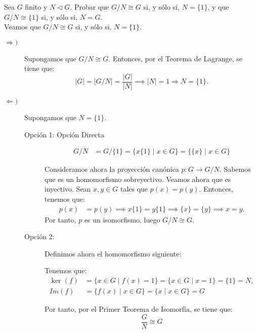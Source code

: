 \begin{ejercicio}\label{ej:9_relacion4}
    Sea $G$ finito y $N\lhd G$. Probar que $G/N\cong G$ si, y sólo si, $N=\{1\}$, y que $G/N\cong \{1\}$ si, y sólo si, $N=G$.\\

    Veamos que $G/N\cong G$ si, y sólo si, $N=\{1\}$.
    \begin{description}
        \item[$\Longrightarrow)$] Supongamos que $G/N\cong G$. Entonces, por el Teorema de Lagrange, se tiene que:
        \begin{equation*}
            |G| = |G/N| = \dfrac{|G|}{|N|} \implies |N|=1\Longrightarrow N=\{1\}.
        \end{equation*}

        \item[$\Longleftarrow)$] Supongamos que $N=\{1\}$.
        \begin{description}
            \item[Opción 1: Opción Directa]
            \begin{align*}
                G/N &= G/\{1\} = \{x\{1\}\mid x\in G\} = \{\{x\}\mid x\in G\}
            \end{align*}

            Consideramos ahora la proyección canónica $p:G\to G/N$. Sabemos que es un homomorfismo sobreyectivo. Veamos ahora que es inyectivo. Sean $x,y\in G$ tales que $p(x)=p(y)$. Entonces, tenemos que:
            \begin{align*}
                p(x) &= p(y) \implies x\{1\} = y\{1\} \implies \{x\} = \{y\} \implies x=y.
            \end{align*}
            Por tanto, $p$ es un isomorfismo, luego $G/N\cong G$.
            
            \item[Opción 2:]
            Definimos ahora el homomorfismo siguiente:

            Tenemos que:
            \begin{align*}
                \ker(f) &= \{x\in G\mid f(x)=1\} = \{x\in G\mid x=1\} = \{1\} = N,\\
                Im(f) &= \{f(x)\mid x\in G\} = \{x\mid x\in G\} = G
            \end{align*}

            Por tanto, por el Primer Teorema de Isomorfía, se tiene que:
            \begin{equation*}
                \dfrac{G}{N}\cong G
            \end{equation*}
        \end{description}
    \end{description}


\end{ejercicio}

